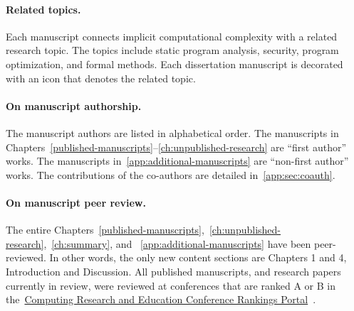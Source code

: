 \begin{description}
      
\end{description}

\paragraph*{Related topics.}
Each manuscript connects implicit computational complexity with a related
research topic. The topics include static program analysis, security, program
optimization, and formal methods. Each dissertation manuscript is decorated with
an icon that denotes the related topic.

\paragraph*{On manuscript authorship.}
The manuscript authors are listed in alphabetical order. The manuscripts in
Chapters~\ref{published-manuscripts}--\ref{ch:unpublished-research} are
\enquote{first author} works. The manuscripts
in~\autoref{app:additional-manuscripts} are \enquote{non-first author} works.
The contributions of the co-authors are detailed in~\autoref{app:sec:coauth}.

\paragraph*{On manuscript peer review.}
The entire
Chapters~\ref{published-manuscripts},~\ref{ch:unpublished-research},~\ref{ch:summary},
and ~\ref{app:additional-manuscripts} have been peer-reviewed. In other words,
the only new content sections are Chapters 1 and 4, Introduction and Discussion.
All published manuscripts, and research papers currently in review, were
reviewed at conferences that are ranked A or B in
the~\href{https://portal.core.edu.au/conf-ranks/}{Computing Research and
Education Conference Rankings Portal}~\cite{core}.

